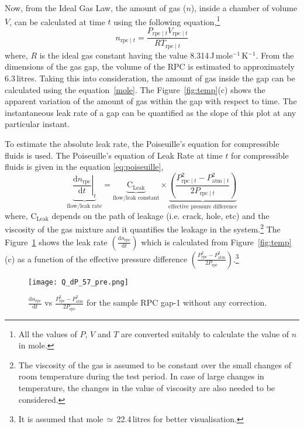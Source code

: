 Now, from the Ideal Gas Law, the amount of gas ($n$), inside a chamber of
volume $V$, can be calculated at time $t$ using the following equation,\footnote{All the values of $P$, $V$ and $T$ are converted suitably to calculate the value of $n$ in mole.}
\begin{equation}
  n_{\textrm{rpc}\mid t}=\frac{P_{\textrm{rpc}\mid t}V_{\textrm{rpc}\mid t}}{RT_{\textrm{rpc}\mid t}} \label{mole}
\end{equation}
where, $R$ is the ideal gas constant having the value
8.314\,J\,mole$^{-1}$\,K$^{-1}$. From the dimensions of the gas gap,
the volume of the RPC is estimated to approximately 6.3\,litres.
Taking this into consideration, the amount of gas inside the gap can
be calculated using the equation~\ref{mole}.
The Figure~\ref{fig:temp}(c) shows the apparent variation
of the amount of gas within the gap with respect to time.
The instantaneous leak rate of a gap can be quantified as the slope
of this plot at any particular instant.

To estimate the absolute leak rate, the Poiseuille's equation for compressible
fluids\cite{poiseuille} is used. The Poiseuille's equation of Leak Rate at time
$t$ for compressible fluids is given in the equation \ref{eq:poiseuille},
\begin{equation}
  \underbrace{\left.\frac{\mathrm{d}n_{\textrm{rpc}}}{\mathrm{d}t}\right| _t}_\text{flow/leak rate}=\underbrace{\textrm{C}_{\textrm{Leak}}}_\text{flow/leak constant}\times\underbrace{\left(\frac {P_{{\textrm{rpc}\mid t} }^{2}-P_{{\textrm{atm}\mid t} }^{2}}{2P_{{\textrm{rpc}\mid t} }}\right)}_\text{effective pressure difference}\label{eq:poiseuille}
\end{equation}
where, $\textrm{C}_{\textrm{Leak}}$ depends on the path of leakage (i.e. crack,
hole, etc) and the viscosity of the gas mixture and it quantifies the leakage
in the system.\footnote{The viscosity of the gas is assumed to be constant over
  the small changes of room temperature during the test period. In case of
  large changes in temperature, the changes in the value of viscosity are also
  needed to be considered.} The Figure~\ref{fig:preQt} shows the leak rate
$\left(\frac{\mathrm{d}n_{\textrm{rpc}}}{\mathrm{d}t}\right)$ which is calculated
from Figure~\ref{fig:temp}(c) as a function of the effective pressure
difference $\left(\frac{P_{\textrm{rpc}}^{2}-P_{\textrm{atm}}^{2}}{2P_{\textrm{rpc}}}\right)$.\footnote{It is assumed that mole\,$\simeq$\,22.4\,litres for better visualisation.} 
\begin{figure}
  \centering
  \texttt{[image: Q\_dP\_57\_pre.png]}
  \caption{$\frac{\mathrm{d}n_{\textrm{rpc}}}{\mathrm{d}t}$ vs
    $\frac{P_{\textrm{rpc}}^{2}-P_{\textrm{atm}}^{2}}{2P_{\textrm{rpc}}}$ for the sample
    RPC gap-1 without any correction.}
  \label{fig:preQt}
\end{figure}

